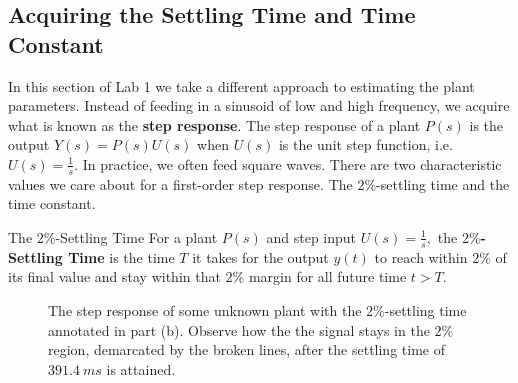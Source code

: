 \subsection{Acquiring the Settling Time and Time Constant}
In this section of Lab 1 we take a different approach to estimating the plant
parameters. Instead of feeding in a sinusoid of low and high frequency, we
acquire what is known as the \textbf{step response}. The step response of
a plant \(P(s)\) is the output \(Y(s) = P(s) U(s)\) when \(U(s)\) is the unit
step function, i.e. \(U(s) = \frac{1}{s}.\) In practice, we often feed
square waves.
%
There are two characteristic values we care about for a first-order step
response. The \(2\%\)-settling time and the time constant.
\begin{definition}[]{The \(2\%\)-Settling Time}
  For a plant \(P(s)\) and step input \(U(s) = \frac{1}{s},\)
  the \textbf{\(2\%\)-Settling Time} is the time \(T\) it takes for
  the output \(y(t)\) to reach within \(2\%\) of its final value and stay
  within that \(2\%\) margin for all future time \(t > T.\)
\end{definition}
%
\begin{figure}
  \centering
  \hfill
  \caption[Step Response for a Linear Plant depicting Settling Time Measurements]{
    The step response of some unknown plant with the \(2\%\)-settling time
    annotated in part (b). Observe how the the signal stays in
    the \(2\%\) region, demarcated by the broken lines,
    after the settling time of \(\SI{391.4}{ms}\) is attained.
  }
  \label{fig:lab1:settling-time}
\end{figure}
